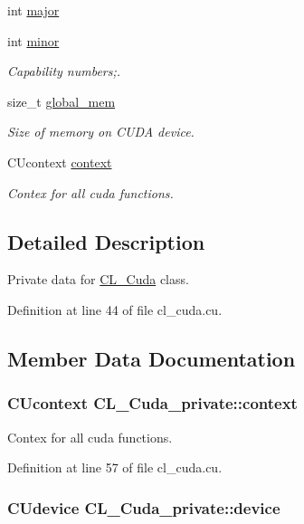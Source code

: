 \begin{DoxyCompactItemize}
int \hyperlink{classCL__Cuda__private_a9cc50a203aee2dec568464e102f4cb54}{major}
\item 
int \hyperlink{classCL__Cuda__private_a7b640660cd0e6b853d6a1e8d57d9f9dc}{minor}
\begin{DoxyCompactList}\small\item\em Capability numbers;. \item\end{DoxyCompactList}\item 
size\_\-t \hyperlink{classCL__Cuda__private_a66237a60653b0a5c1fe4fd21bb688da2}{global\_\-mem}
\begin{DoxyCompactList}\small\item\em Size of memory on CUDA device. \item\end{DoxyCompactList}\item 
CUcontext \hyperlink{classCL__Cuda__private_a5cee71c336fd132e3030dd02045eef43}{context}
\begin{DoxyCompactList}\small\item\em Contex for all cuda functions. \item\end{DoxyCompactList}\end{DoxyCompactItemize}


\subsection{Detailed Description}
Private data for \hyperlink{classCL__Cuda}{CL\_\-Cuda} class. 

Definition at line 44 of file cl\_\-cuda.cu.

\subsection{Member Data Documentation}
\hypertarget{classCL__Cuda__private_a5cee71c336fd132e3030dd02045eef43}{
\subsubsection[{context}]{\setlength{\rightskip}{0pt plus 5cm}CUcontext {\bf CL\_\-Cuda\_\-private::context}}}
\label{classCL__Cuda__private_a5cee71c336fd132e3030dd02045eef43}


Contex for all cuda functions. 

Definition at line 57 of file cl\_\-cuda.cu.\hypertarget{classCL__Cuda__private_a8743e6aaa2155f6695cd8165f07f8225}{
\subsubsection[{device}]{\setlength{\rightskip}{0pt plus 5cm}CUdevice {\bf CL\_\-Cuda\_\-private::device}}}
\label{classCL__Cuda__private_a8743e6aaa2155f6695cd8165f07f8225}


